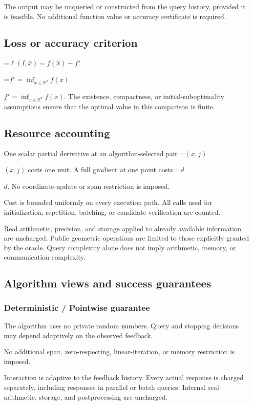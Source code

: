 \documentclass[10pt,a4paper]{article}
\newcommand{\AtlasMath}[1]{\par\begingroup\centering\setbox0=\hbox{$\displaystyle #1$}\ifdim\wd0>1.4\linewidth\typeout{ATLAS WIDE FORMULA: \the\wd0}\fi\ifdim\wd0>\linewidth\resizebox{\linewidth}{!}{\box0}\else\box0\fi\par\endgroup}
\newcommand{\AtlasInlineMath}[1]{\begingroup\setbox0=\hbox{$#1$}\ifdim\wd0>.4\linewidth\endgroup\AtlasMath{#1}\else\endgroup$#1$\fi}
\begin{document}
The output may be unqueried or constructed from the query history, provided it is feasible. No additional function value or accuracy certificate is required.

\subsection{Loss or accuracy criterion}

\AtlasMath{\ell(I,\widehat{x})=f(\widehat{x})-f^\star}


\AtlasInlineMath{f^\star=\inf_{x\in \mathbb{R}^d}f(x)}. The existence, compactness, or initial-suboptimality assumptions ensure that the optimal value in this comparison is finite.

\subsection{Resource accounting}
One scalar partial derivative at an algorithm-selected pair \AtlasInlineMath{(x,j)} costs one unit. A full gradient at one point costs \AtlasInlineMath{d}. No coordinate-update or span restriction is imposed.

Cost is bounded uniformly on every execution path. All calls used for initialization, repetition, batching, or candidate verification are counted.

Real arithmetic, precision, and storage applied to already available information are uncharged. Public geometric operations are limited to those explicitly granted by the oracle. Query complexity alone does not imply arithmetic, memory, or communication complexity.

\subsection{Algorithm views and success guarantees}
\subsubsection{Deterministic / Pointwise guarantee}
The algorithm uses no private random numbers. Query and stopping decisions may depend adaptively on the observed feedback.

No additional span, zero-respecting, linear-iteration, or memory restriction is imposed.

Interaction is adaptive to the feedback history. Every actual response is charged separately, including responses in parallel or batch queries. Internal real arithmetic, storage, and postprocessing are uncharged.
\end{document}
